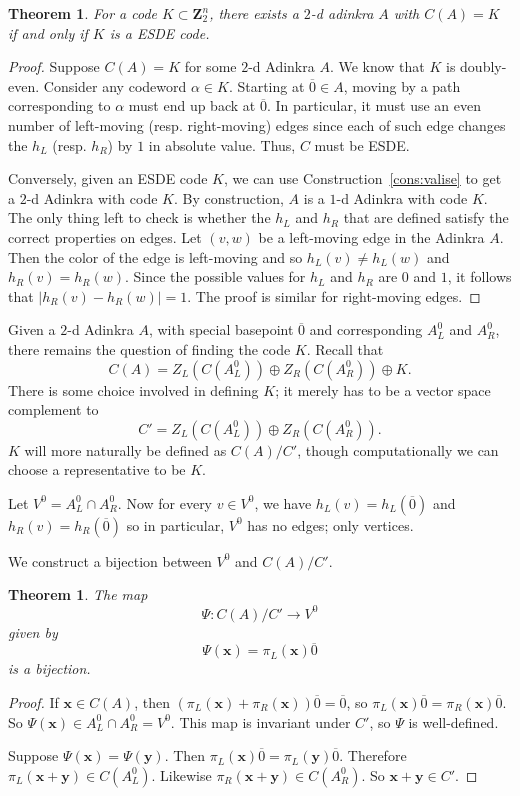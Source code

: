 \documentclass[12pt,twoside,singlespace]{article}
\numberwithin{equation}{section}
\newtheorem{thm}[equation]{Theorem}
\theoremstyle{definition}
\newcommand{\ZZ}{\mathbf{Z}}
\renewcommand{\vec}[1]{\mathbf{#1}}
\begin{document}
\begin{thm}
\label{thm:esde}
For a code $K \subset \ZZ_2^n$, there exists a $2$-d adinkra $A$ with $C(A) = K$ if and only if $K$ is a ESDE code.
\end{thm}
\begin{proof}
Suppose $C(A) = K$ for some $2$-d Adinkra $A$. We know that $K$ is doubly-even. Consider any codeword $\alpha \in K$. Starting at $\overline{0} \in A$, moving by a path corresponding to $\alpha$ must end up back at $\overline{0}$. In particular, it must use an even number of left-moving (resp. right-moving) edges since each of such edge changes the $h_L$ (resp. $h_R$) by $1$ in absolute value. Thus, $C$ must be ESDE. 

Conversely, given an ESDE code $K$, we can use Construction~\ref{cons:valise} to get a $2$-d Adinkra with code $K$. By construction, $A$ is a $1$-d Adinkra with code $K$.  The only thing left to check is whether the $h_L$ and $h_R$ that are defined satisfy the correct properties on edges. Let $(v,w)$ be a left-moving edge in the Adinkra $A$.  Then the color of the edge is left-moving and so $h_L(v)\not=h_L(w)$ and $h_R(v)=h_R(w)$.  Since the possible values for $h_L$ and $h_R$ are $0$ and $1$, it follows that $|h_R(v)-h_R(w)|=1$. The proof is similar for right-moving edges.

\end{proof}

Given a $2$-d Adinkra $A$, with special basepoint $\overline{0}$ and corresponding $A_L^0$ and $A_R^0$, there remains the question of finding the code $K$.  Recall that
\[C(A)=Z_L(C(A_L^0))\oplus Z_R(C(A_R^0))\oplus K.\]
There is some choice involved in defining $K$; it merely has to be a vector space complement to
\[C'=Z_L(C(A_L^0))\oplus Z_R(C(A_R^0)).\]
$K$ will more naturally be defined as $C(A)/C'$, though computationally we can choose a representative to be $K$.


Let $V^0=A_L^0\cap A_R^0$.  Now for every $v\in V^0$, we have $h_L(v)=h_L(\overline{0})$ and $h_R(v)=h_R(\overline{0})$ so in particular, $V^0$ has no edges; only vertices.

We construct a bijection between $V^0$ and $C(A)/C'$.

\begin{thm}
\label{thm:findk}
The map
\[\Psi:C(A)/C'\to V^0\]
given by
\[\Psi(\vec{x})=\pi_L(\vec{x})\overline{0}\]
is a bijection.
\end{thm}
\begin{proof}
If $\vec{x}\in C(A)$, then $(\pi_L(\vec{x})+\pi_R(\vec{x}))\overline{0}=\overline{0}$, so $\pi_L(\vec{x})\overline{0}=\pi_R(\vec{x})\overline{0}$.  So $\Psi(\vec{x})\in A_L^0\cap A_R^0=V^0$.  This map is invariant under $C'$, so $\Psi$ is well-defined.

Suppose $\Psi(\vec{x})=\Psi(\vec{y})$.  Then $\pi_L(\vec{x})\overline{0}=\pi_L(\vec{y})\overline{0}$.  Therefore $\pi_L(\vec{x}+\vec{y})\in C(A_L^0)$.  Likewise $\pi_R(\vec{x}+\vec{y})\in C(A_R^0)$.  So $\vec{x}+\vec{y}\in C'$.
\end{proof}
\end{document}
